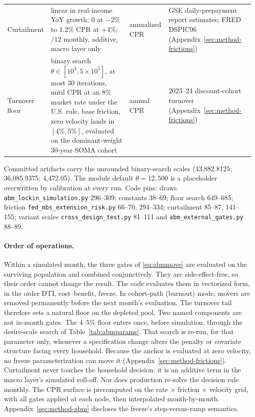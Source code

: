 \documentclass[12pt]{article}
\begin{document}
\begin{table}[H]
\begin{threeparttable}
\begin{tabular}{@{}p{3.3cm}p{5.9cm}p{1.6cm}p{4.0cm}@{}}
Curtailment & linear in real-income YoY growth: 0 at $-2\%$ to 1.2\% CPR at $+4\%$; $/12$ monthly, additive, macro layer only & annualized CPR & GSE daily-prepayment report estimates; FRED DSPIC96 (Appendix~\ref{sec:method-frictions}) \\
Turnover floor & binary search $\theta \in [10^{3}, 5\times10^{5}]$, at most 30 iterations, until CPR at an 8\% market rate under the U.S. rule, base friction, zero velocity lands in $[4\%, 5\%]$, evaluated on the dominant-weight 30-year SOMA cohort & annual CPR & 2023--24 discount-cohort turnover (Appendix~\ref{sec:method-frictions}) \\
\bottomrule
\end{tabular}
\begin{tablenotes}
\footnotesize
\item Committed artifacts carry the unrounded binary-search scales (43{,}882.8125; 36{,}085.9375; 4{,}472.05). The module default $\theta = 12{,}500$ is a placeholder overwritten by calibration at every run. Code pins: draws \texttt{abm\_lockin\_simulation.py} 296--309; constants 38--69; floor search 649--685; friction \texttt{fed\_mbs\_extension\_risk.py} 66--70, 294--334; curtailment 85--87, 141--155; variant scales \texttt{cross\_design\_test.py} 81--111 and \texttt{abm\_external\_gates.py} 88--89.
\end{tablenotes}
\end{threeparttable}
\end{table}

\paragraph{Order of operations.}
Within a simulated month, the three gates of \eqref{eq:abmmove} are evaluated on the surviving population and combined conjunctively. They are side-effect-free, so their order cannot change the result. The code evaluates them in vectorized form, in the order DTI, cost--benefit, freeze. %
In cohort-path (burnout) mode, movers are removed permanently before the next month's evaluation. The turnover tail therefore sets a natural floor on the depleted pool. %
Two named components are not in-month gates. The 4--5\% floor enters once, before simulation, through the desire-scale search of Table~\ref{tab:abmparams}. That search is re-run, for that parameter only, whenever a specification change alters the penalty or covariate structure facing every household. Because the anchor is evaluated at zero velocity, no freeze parameterization can move it (Appendix~\ref{sec:method-frictions}). %
Curtailment never touches the household decision: it is an additive term in the macro layer's simulated roll-off. Nor does production re-solve the decision rule monthly. The CPR surface is precomputed on the rate $\times$ friction $\times$ velocity grid, with all gates applied at each node, then interpolated month-by-month. Appendix~\ref{sec:method-abm} discloses the freeze's step-versus-ramp semantics. %
\end{document}
